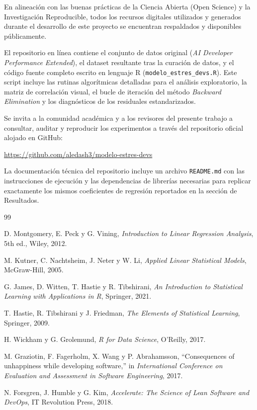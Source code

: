 \documentclass[procedia]{easychair}
\begin{document}
En alineación con las buenas prácticas de la Ciencia Abierta (Open Science) y la Investigación Reproducible, todos los recursos digitales utilizados y generados durante el desarrollo de este proyecto se encuentran respaldados y disponibles públicamente. 

El repositorio en línea contiene el conjunto de datos original (\textit{AI Developer Performance Extended}), el dataset resultante tras la curación de datos, y el código fuente completo escrito en lenguaje R (\texttt{modelo\_estres\_devs.R}). Este script incluye las rutinas algorítmicas detalladas para el análisis exploratorio, la matriz de correlación visual, el bucle de iteración del método \textit{Backward Elimination} y los diagnósticos de los residuales estandarizados. 

Se invita a la comunidad académica y a los revisores del presente trabajo a consultar, auditar y reproducir los experimentos a través del repositorio oficial alojado en GitHub: 

\begin{center}
\url{https://github.com/aledash3/modelo-estres-devs}
\end{center}

La documentación técnica del repositorio incluye un archivo \texttt{README.md} con las instrucciones de ejecución y las dependencias de librerías necesarias para replicar exactamente los mismos coeficientes de regresión reportados en la sección de Resultados.
\begin{thebibliography}{99}

D. Montgomery, E. Peck y G. Vining,
\textit{Introduction to Linear Regression Analysis},
5th ed.,
Wiley,
2012.

M. Kutner, C. Nachtsheim, J. Neter y W. Li,
\textit{Applied Linear Statistical Models},
McGraw-Hill,
2005.

G. James, D. Witten, T. Hastie y R. Tibshirani,
\textit{An Introduction to Statistical Learning with Applications in R},
Springer,
2021.

T. Hastie, R. Tibshirani y J. Friedman,
\textit{The Elements of Statistical Learning},
Springer,
2009.

H. Wickham y G. Grolemund,
\textit{R for Data Science},
O'Reilly,
2017.

M. Graziotin, F. Fagerholm, X. Wang y P. Abrahamsson,
``Consequences of unhappiness while developing software,''
in \textit{International Conference on Evaluation and Assessment in Software Engineering},
2017.

N. Forsgren, J. Humble y G. Kim,
\textit{Accelerate: The Science of Lean Software and DevOps},
IT Revolution Press,
2018.

\end{thebibliography}
\end{document}

